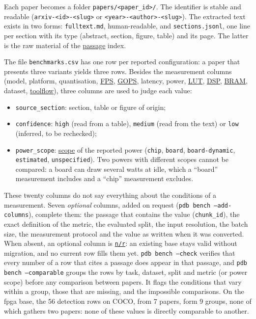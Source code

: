 \documentclass[11pt,a4paper]{article}
\newcommand{\cmd}[1]{\texttt{#1}}
\newcommand{\gl}[2]{\hyperlink{gl:#1}{\textcolor{glcolor}{#2}}}
\newcommand{\nr}{\gl{nr}{\texttt{n/r}}}
\begin{document}
Each paper becomes a folder \cmd{papers/<paper\_id>/}. The identifier is stable and readable
(\cmd{arxiv-<id>-<slug>} or \cmd{<year>-<author>-<slug>}). The extracted text exists in two
forms: \cmd{fulltext.md}, human-readable, and \cmd{sections.jsonl}, one line per section with
its type (abstract, section, figure, table) and its page. The latter is the raw material of
the \gl{passage}{passage} index.

The file \cmd{benchmarks.csv} has one row per reported configuration: a paper that presents
three variants yields three rows. Besides the measurement columns (model, platform,
quantisation, \gl{FPS}{FPS}, \gl{GOPS}{GOPS}, latency, power, \gl{LUT}{LUT}, \gl{DSP}{DSP}, \gl{BRAM}{BRAM}, dataset, \gl{toolflow}{toolflow}), three columns
are used to judge each value:
\begin{itemize}
  \item \cmd{source\_section}: section, table or figure of origin;
  \item \cmd{confidence}: \cmd{high} (read from a table), \cmd{medium} (read from the text)
    or \cmd{low} (inferred, to be rechecked);
  \item \cmd{power\_scope}: \gl{scope}{scope} of the reported power (\cmd{chip}, \cmd{board},
    \cmd{board-dynamic}, \cmd{estimated}, \cmd{unspecified}). Two powers with different
    scopes cannot be compared: a board can draw several watts at idle, which a ``board''
    measurement includes and a ``chip'' measurement excludes.
\end{itemize}
These twenty columns do not say everything about the conditions of a measurement. Seven
\emph{optional} columns, added on request (\cmd{pdb bench --add-columns}), complete them: the
passage that contains the value (\cmd{chunk\_id}), the exact definition of the metric, the
evaluated split, the input resolution, the batch size, the measurement protocol and the value
as written when it was converted. When absent, an optional column is \nr{}: an existing base
stays valid without migration, and no current row fills them yet. \cmd{pdb bench --check}
verifies that every number of a row that cites a passage does appear in that passage, and
\cmd{pdb bench --comparable} groups the rows by task, dataset, split and metric (or power
scope) before any comparison between papers. It flags the conditions that vary within a
group, those that are missing, and the impossible comparisons. On the fpga base, the 56
detection rows on COCO, from 7 papers, form 9 groups, none of which gathers two papers: none
of these values is directly comparable to another.
\end{document}
